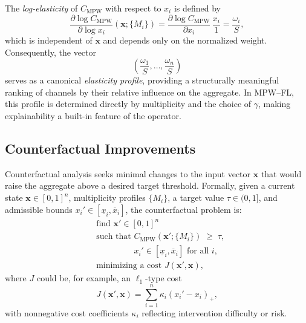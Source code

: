 \documentclass[11pt]{article}
\begin{document}
The \emph{log-elasticity} of $C_{\mathrm{MPW}}$ with respect to $x_i$ is defined by
\[
  \frac{\partial \log C_{\mathrm{MPW}}}{\partial \log x_i}(\mathbf{x};\{M_i\})
  = \frac{\partial \log C_{\mathrm{MPW}}}{\partial x_i}\,\frac{x_i}{1}
  = \frac{\omega_i}{S},
\]
which is independent of $\mathbf{x}$ and depends only on the normalized weight. Consequently, the vector
\[
  \left(\frac{\omega_1}{S}, \dots, \frac{\omega_n}{S}\right)
\]
serves as a canonical \emph{elasticity profile}, providing a structurally meaningful ranking of channels by their relative influence on the aggregate. In MPW--FL, this profile is determined directly by multiplicity and the choice of $\gamma$, making explainability a built-in feature of the operator.

\subsection{Counterfactual Improvements}
\label{subsec:counterfactuals}

Counterfactual analysis seeks minimal changes to the input vector $\mathbf{x}$ that would raise the aggregate above a desired target threshold. Formally, given a current state $\mathbf{x} \in [0,1]^n$, multiplicity profiles $\{M_i\}$, a target value $\tau \in (0,1]$, and admissible bounds $x_i' \in [\underline{x}_i,\overline{x}_i]$, the counterfactual problem is:
\begin{equation}
  \begin{aligned}
    &\text{find } \mathbf{x}' \in [0,1]^n \\
    &\text{such that } C_{\mathrm{MPW}}(\mathbf{x}';\{M_i\}) \;\ge\; \tau, \\
    &\phantom{\text{such that }} x_i' \in [\underline{x}_i,\overline{x}_i] \text{ for all } i, \\
    &\text{minimizing a cost } J(\mathbf{x}',\mathbf{x}),
  \end{aligned}
  \label{eq:counterfactual-problem}
\end{equation}
where $J$ could be, for example, an $\ell_1$-type cost
\[
  J(\mathbf{x}',\mathbf{x}) = \sum_{i=1}^n \kappa_i (x_i' - x_i)_+,
\]
with nonnegative cost coefficients $\kappa_i$ reflecting intervention difficulty or risk.
\end{document}
